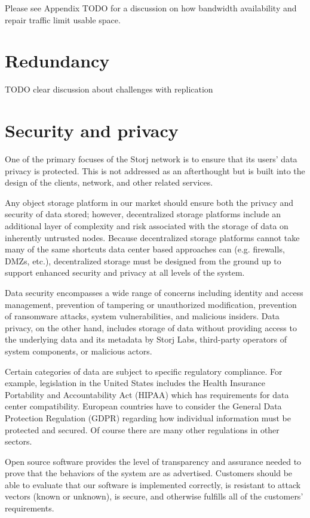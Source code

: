 \documentclass[11pt,fleqn,openany]{book}
\newcommand{\todo}[1]{{\color{red} TODO #1 }}
\begin{document}
Please see Appendix \todo{} for a discussion on how bandwidth availability
and repair traffic limit usable space.

\section{Redundancy}

\todo{clear discussion about challenges with replication}

\section{Security and privacy}

One of the primary focuses of the Storj network is to ensure that its users'
data privacy is protected. This is not addressed as an afterthought but is
built into the design of the clients, network, and other related services.

Any object storage platform in our market should ensure both the privacy and
security of data stored; however,
decentralized storage platforms include an additional layer of
complexity and risk associated with the storage of data on inherently
untrusted nodes. Because decentralized storage platforms cannot take many
of the same shortcuts data center based approaches can (e.g. firewalls, DMZs,
etc.), decentralized storage must be designed from the ground up to support
enhanced security and privacy at all levels of the system.

Data security encompasses a wide range of concerns including
identity and access management, prevention of tampering or unauthorized
modification, prevention of ransomware attacks, system vulnerabilities, and
malicious insiders. Data privacy, on the other hand, includes storage of data
without providing access to the underlying data and its metadata by
Storj Labs, third-party operators of system components, or malicious actors.

Certain categories of data are subject to specific regulatory compliance.
For example, legislation in the United States includes
the Health Insurance Portability and
Accountability Act (HIPAA) which has requirements for data center
compatibility. European countries have to consider the General Data Protection
Regulation (GDPR) regarding
how individual information must be protected and secured. Of course there
are many other regulations in other sectors.

Open source software
provides the level of transparency and assurance needed to prove that the
behaviors of the system are as advertised. Customers should be able to
evaluate that our software is implemented correctly, is resistant to
attack vectors (known or unknown), is secure, and otherwise fulfills all
of the customers' requirements.
\end{document}
